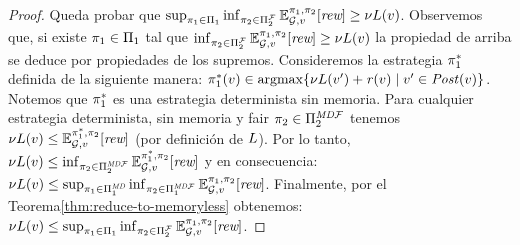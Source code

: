 \begin{proof}
  Queda probar que $\sup_{\pi_{1} \in \Pi_{1}}   \inf_{\pi_{2} \in \Pi^{\mathcal{F}}_{2}}  \mathbb{E}^{\pi_{1}, \pi_{2}}_{\mathcal{G},v}[\textit{rew}] \geq \nu L(v)$. Observemos que, si existe  $\pi_{1} \in \Pi_{1}$ tal que
  $\inf_{\pi_{2} \in \Pi^{\mathcal{F}}_{2}}  \mathbb{E}^{\pi_{1}, \pi_{2}}_{\mathcal{G},v}[\textit{rew}] \geq \nu L(v)$ la propiedad de arriba se deduce por propiedades de los supremos. Consideremos la estrategia $\pi^*_{1}$ definida de la siguiente manera:
  $\pi^*_{1}(v) \in \operatorname*{argmax} \{\nu L(v') + \mathit{r}(v) \mid v' \in \mathit{Post}(v) \}$. Notemos que $\pi^*_{1}$ es una estrategia determinista sin memoria. Para cualquier estrategia determinista, sin memoria y fair $\pi_{2} \in \Pi^{\textit{MD}\mathcal{F}}_{2}$ tenemos
  $\nu L(v) \leq \mathbb{E}^{\pi^*_{1}, \pi_{2}}_{\mathcal{G},v}[\textit{rew}]$ (por definición de $L$).  Por lo tanto,
  $\nu L(v) \leq \inf_{\pi_{2} \in \Pi^{\textit{MD}\mathcal{F}}_{2}} \mathbb{E}^{\pi^*_{1}, \pi_{2}}_{\mathcal{G},v}[\textit{rew}]$
  y en consecuencia:
  $\nu L(v) \leq \sup_{\pi_{1} \in \Pi^{\textit{MD}}_{1}} \inf_{\pi_{2} \in \Pi^{\textit{MD}\mathcal{F}}_{1}} \mathbb{E}^{\pi_{1}, \pi_{2}}_{\mathcal{G},v}[\textit{rew}]$.
  Finalmente, por el Teorema\ref{thm:reduce-to-memoryless} obtenemos:
  $\nu L(v) \leq \sup_{\pi_{1} \in \Pi_{1}} \inf_{\pi_{2} \in \Pi^{\mathcal{F}}_{2}} \mathbb{E}^{\pi_{1}, \pi_{2}}_{\mathcal{G},v}[\textit{rew}]$.
  \qedhere
\end{proof}
%
